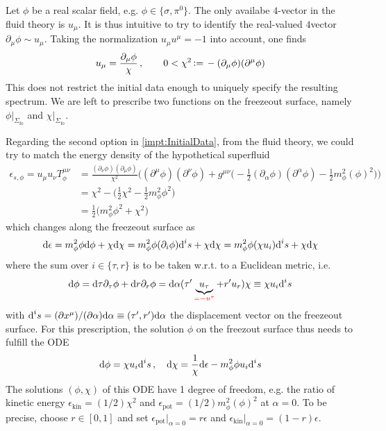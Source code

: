 Let $\phi$ be a real scalar field, e.g. $\phi\in\{\sigma,\pi^0\}$. The only availabe $4$-vector in the fluid theory is $u_\mu$. It is thus intuitive to try to identify the real-valued $4$vector $\partial_\mu\phi\sim u_\mu$. Taking the normalization $u_\mu u^\mu=-1$ into account, one finds
\begin{equation}
    u_\mu=\frac{\partial_\mu\phi}{\chi}\,,\qquad0<\chi^2{\,\vcentcolon=\,}-(\partial_\mu\phi)(\partial^\mu\phi)
\end{equation}
This does not restrict the initial data enough to uniquely specify the resulting spectrum. We are left to prescribe two functions on the freezeout surface, namely $\phi\vert_{\Sigma_{\text{fo}}}$ and $\chi\vert_{\Sigma_{\text{fo}}}$.

Regarding the second option in \ref{impt:InitialData}, from the fluid theory, we could try to match the energy density of the hypothetical superfluid
\begin{subequations}
    \begin{align}
        \epsilon_{s,\phi}=u_\mu u_\nu T^{\mu\nu}_{\phi}&=\frac{(\partial_\nu\phi)(\partial_\mu\phi)}{\chi^2}\Big((\partial^\mu\phi)(\partial^\nu\phi)+g^{\mu\nu}\big(-\frac{1}{2}(\partial_\alpha\phi)(\partial^\alpha\phi)-\frac{1}{2}m_\phi^2(\phi)^2\big)\Big)   \\
        &=\chi^2-\big(\frac{1}{2}\chi^2-\frac{1}{2}m_\phi^2\phi^2\big)  \\
        &=\frac{1}{2}\big(m_\phi^2\phi^2+\chi^2\big)
    \end{align}
\end{subequations}
which changes along the freezeout surface as
    \begin{equation}
        \text{d}\epsilon=m_\phi^2\phi\text{d}\phi+\chi\text{d}\chi=m_\phi^2\phi(\partial_i\phi)\text{d}^i s+\chi\text{d}\chi=m_\phi^2\phi(\chi u_i)\text{d}^i s+\chi\text{d}\chi
    \end{equation}
where the sum over $i\in\{\tau,r\}$ is to be taken w.r.t. to a Euclidean metric, i.e.
\begin{equation}
    \text{d}\phi=\text{d}\tau\partial_\tau\phi+\text{d} r\partial_r\phi=\text{d}\alpha(\tau^\prime \underbrace{u_\tau}_{\textcolor{red}{=-u^\tau}}+r^\prime u_r)\chi\equiv\chi u_i\text{d}^is
\end{equation}
with $\text{d}^i s=(\partial x^\mu)/(\partial\alpha)\text{d}\alpha\equiv(\tau^\prime,r^\prime)\text{d}\alpha$ the displacement vector on the freezeout surface. For this prescription, the solution $\phi$ on the freezout surface thus needs to fulfill the ODE
\begin{equation}
    \text{d}\phi=\chi u_i\text{d}^i s\,,\quad
    \text{d}\chi=\frac{1}{\chi}\text{d}\epsilon-m_\phi^2\phi u_i\text{d}^i s
\end{equation}
The solutions $(\phi,\chi)$ of this ODE have 1 degree of freedom, e.g. the ratio of kinetic energy $\epsilon_{\text{kin}}=(1/2)\chi^2$ and $\epsilon_{\text{pot}}=(1/2)m_\phi^2(\phi)^2$ at $\alpha=0$. To be precise, choose $r\in[0,1]$ and set $\epsilon_{\text{pot}}\big\vert_{\alpha=0}=r\epsilon$ and $\epsilon_{\text{kin}}\big\vert_{\alpha=0}=(1-r)\epsilon$.

